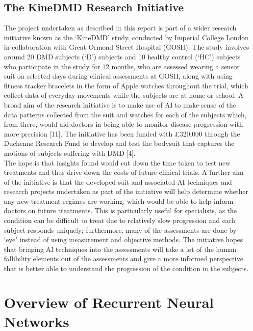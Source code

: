 \documentclass[12pt,twoside]{report}
\begin{document}
\section{The KineDMD Research Initiative}

\quad The project undertaken as described in this report is part of a wider research initiative known as the ‘KineDMD’ study, conducted by Imperial College London in collaboration with Great Ormond Street Hospital (GOSH). The study involves around 20 DMD subjects (‘D’) subjects and 10 healthy control (‘HC’) subjects who participate in the study for 12 months, who are assessed wearing a sensor suit on selected days during clinical assessments at GOSH, along with using fitness tracker bracelets in the form of Apple watches throughout the trial, which collect data of everyday movements while the subjects are at home or school. A broad aim of the research initiative is to make use of AI to make sense of the data patterns collected from the suit and watches for each of the subjects which, from there, would aid doctors in being able to monitor disease progression with more precision [11]. The initiative has been funded with £320,000 through the Duchenne Research Fund to develop and test the bodysuit that captures the motions of subjects suffering with DMD [4].\\

\quad The hope is that insights found would cut down the time taken to test new treatments and thus drive down the costs of future clinical trials. A further aim of the initiative is that the developed suit and associated AI techniques and research projects undertaken as part of the initiative will help determine whether any new treatment regimes are working, which would be able to help inform doctors on future treatments. This is particularly useful for specialists, as the condition can be difficult to treat due to relatively slow progression and each subject responds uniquely; furthermore, many of the assessments are done by ‘eye’ instead of using measurement and objective methods. The initiative hopes that bringing AI techniques into the assessments will take a lot of the human fallibility elements out of the assessments and give a more informed perspective that is better able to understand the progression of the condition in the subjects.\\




\chapter{Overview of Recurrent Neural Networks\\}
\end{document}
